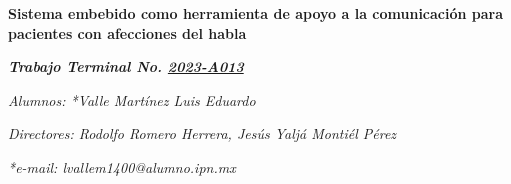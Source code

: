 \begin{center}
    \vspace*{1cm}
    
    {\fontsize{14}{16} \textbf{Sistema embebido como herramienta de apoyo a la comunicación para pacientes con afecciones del habla}}
    
    \vspace{0.2cm}
    
    {\fontsize{12}{14} \textbf{\textit{Trabajo Terminal No. \underline{2023-A013}}} }
    
    \vspace{0.1cm}
    
    \textit{Alumnos: *Valle Martínez Luis Eduardo}
    
    \vspace{0.1cm}
    
    \textit{Directores: Rodolfo Romero Herrera, Jesús Yaljá Montiél Pérez}
    
    \vspace{0.1cm}
    
    \textit{*e-mail: lvallem1400@alumno.ipn.mx}
    
\end{center}